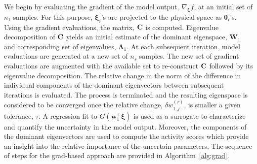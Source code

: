 We begin by evaluating the gradient of the model output, $\nabla_{\bm{\xi}}f$, at an initial set of $n_1$ samples. 
For this purpose, $\bm{\xi}_i$'s are projected to the physical space as $\bm{\theta}_i$'s. Using the gradient
evaluations, the matrix, $\mathbf{{C}}$ is computed. Eigenvalue decomposition of $\mathbf{{C}}$ yields an initial
estimate of the dominant eigenspace, $\bm{W}_1$ and corresponding set of eigenvalues, $\bm{\Lambda}_1$.
At each subsequent iteration, model evaluations are generated at a new set of $n_s$ samples. The new set
of gradient evaluations are augmented with the available set to re-construct $\mathbf{{C}}$ followed by its eigenvalue
decomposition. The relative
change in the norm of the difference in individual components of the dominant eigenvectors between subsequent 
iterations is evaluated. The process is terminated and the resulting eigenspace is considered to be converged once the
relative change, $\delta w_{1,j}^{(r)}$, is smaller a given tolerance, $\tau$. A regression fit to
 $G(\bm{w}_1^\top\bm{\xi})$ is used as a surrogate to characterize and quantify the uncertainty in the model
 output. Moreover, the components of the dominant eigenvectors are used to compute the activity scores which
 provide an insight into the relative importance of the uncertain parameters. The sequence of steps for the grad-based
 approach are provided in Algorithm~\ref{alg:grad}.


